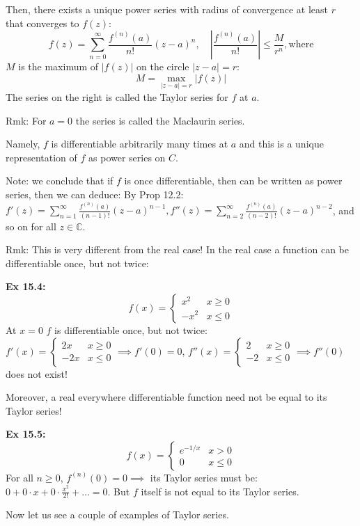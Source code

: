 \documentclass{article}
\begin{document}
Then, there exists a unique power series with radius of convergence at least $r$ that converges to $f(z)$:
$$ f(z) = \sum_{n=0}^{\infty} \frac{f^{(n)}(a)}{n!}(z-a)^n, \quad \left| \frac{f^{(n)}(a)}{n!} \right| \leq \frac{M}{r^n}, \text{where} $$
$M$ is the maximum of $|f(z)|$ on the circle $|z-a| = r$:
$$ M = \max_{|z-a|=r} |f(z)| $$
The series on the right is called the Taylor series for $f$ at $a$.

Rmk: For $a = 0$ the series is called the Maclaurin series.

Namely, $f$ is differentiable arbitrarily many times at $a$ and this is a unique representation of $f$ as power series on $C$.

Note: we conclude that if $f$ is once differentiable, then can be written as power series, then we can deduce: By Prop 12.2: $f'(z) = \sum_{n=1}^{\infty} \frac{f^{(n)}(a)}{(n-1)!}(z-a)^{n-1}, f''(z) = \sum_{n=2}^{\infty} \frac{f^{(n)}(a)}{(n-2)!}(z-a)^{n-2}$, and so on for all $z \in \mathbb{C}$.

Rmk: This is very different from the real case! In the real case a function can be differentiable once, but not twice:

\textbf{Ex 15.4:}
$$ f(x) = \begin{cases}
x^2 & x \geq 0 \\
-x^2 & x \leq 0
\end{cases} $$
At $x = 0$ $f$ is differentiable once, but not twice: $f'(x) = \begin{cases} 2x & x \geq 0 \\ -2x & x \leq 0 \end{cases} \implies f'(0) = 0$, $f''(x) = \begin{cases} 2 & x \geq 0 \\ -2 & x \leq 0 \end{cases} \implies f''(0)$ does not exist!

Moreover, a real everywhere differentiable function need not be equal to its Taylor series!

\textbf{Ex 15.5:}
$$ f(x) = \begin{cases}
e^{-1/x} & x > 0 \\
0 & x \leq 0
\end{cases} $$
For all $n \geq 0$, $f^{(n)}(0) = 0 \implies$ its Taylor series must be: $0 + 0 \cdot x + 0 \cdot \frac{x^2}{2!} + \dots = 0$. But $f$ itself is not equal to its Taylor series.

Now let us see a couple of examples of Taylor series.
\end{document}
